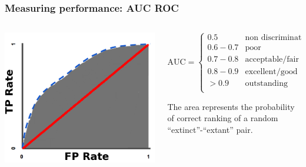 \documentclass{beamer}
\begin{document}
\begin{frame}
  \frametitle{Measuring performance: AUC ROC}

  \begin{columns}
    \begin{column}{0.4\textwidth}
      \includegraphics[width=\textwidth,height=\textheight,keepaspectratio=true]{figure/AUC}


    \end{column}
    \begin{column}{0.6\textwidth}
      \[
        \text{AUC} = 
        \begin{cases} 
          0.5 & \text{non discrimination}\\
          0.6-0.7 & \text{poor} \\
          0.7-0.8 & \text{acceptable/fair} \\
          0.8-0.9 & \text{excellent/good} \\
          > 0.9 & \text{outstanding} \\
        \end{cases}
      \]

      The area represents the probability of correct ranking of a random ``extinct''-``extant'' pair.
    \end{column}
  \end{columns}

\end{frame}
\end{document}
